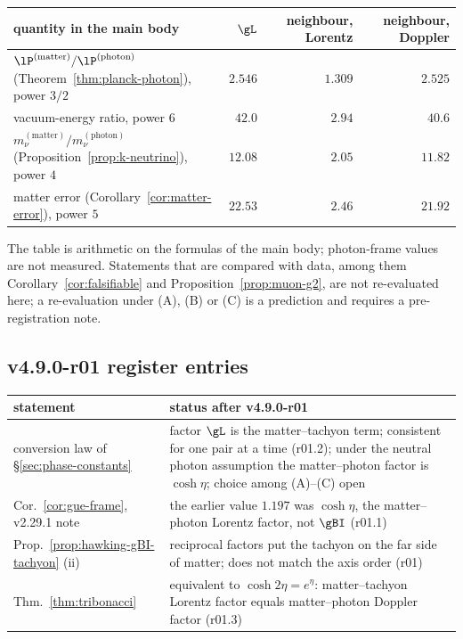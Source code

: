 \begin{center}
\small
\begin{tabular}{@{}lrrr@{}}
\toprule
quantity in the main body & \(\gL\) & neighbour, Lorentz & neighbour, Doppler\\
\midrule
\(\lP^{(\mathrm{matter})}/\lP^{(\mathrm{photon})}\) (Theorem~\ref{thm:planck-photon}), power \(3/2\) & \(2.546\) & \(1.309\) & \(2.525\)\\
vacuum-energy ratio, power \(6\) & \(42.0\) & \(2.94\) & \(40.6\)\\
\(m_\nu^{(\mathrm{matter})}/m_\nu^{(\mathrm{photon})}\) (Proposition~\ref{prop:k-neutrino}), power \(4\) & \(12.08\) & \(2.05\) & \(11.82\)\\
matter error (Corollary~\ref{cor:matter-error}), power \(5\) & \(22.53\) & \(2.46\) & \(21.92\)\\
\bottomrule
\end{tabular}
\end{center}
The table is arithmetic on the formulas of the main body; photon-frame values are not measured.  Statements that are
compared with data, among them Corollary~\ref{cor:falsifiable} and Proposition~\ref{prop:muon-g2}, are not re-evaluated
here; a re-evaluation under (A), (B) or (C) is a prediction and requires a pre-registration note.

\subsection*{v4.9.0-r01 register entries}
\label{subsec:v490-r01-register}

\begin{center}
\small
\begin{tabular}{@{}>{\raggedright\arraybackslash}p{}>{\raggedright\arraybackslash}p{}@{}}
\toprule
statement & status after v4.9.0-r01\\
\midrule
conversion law of \S\ref{sec:phase-constants} & factor \(\gL\) is the matter--tachyon term; consistent for one pair at a time (r01.2); under the neutral photon assumption the matter--photon factor is \(\cosh\eta\); choice among (A)--(C) open\\
Cor.~\ref{cor:gue-frame}, v2.29.1 note & the earlier value \(1.197\) was \(\cosh\eta\), the matter--photon Lorentz factor, not \(\gBI\) (r01.1)\\
Prop.~\ref{prop:hawking-gBI-tachyon} (ii) & reciprocal factors put the tachyon on the far side of matter; does not match the axis order (r01)\\
Thm.~\ref{thm:tribonacci} & equivalent to \(\cosh2\eta=e^{\eta}\): matter--tachyon Lorentz factor equals matter--photon Doppler factor (r01.3)\\
\bottomrule
\end{tabular}
\end{center}

